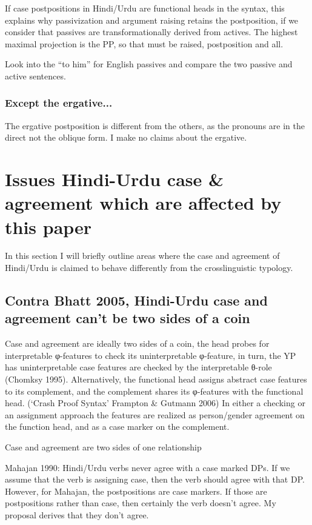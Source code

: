 \documentclass{article}
\begin{document}
If case postpositions in Hindi/Urdu are functional heads in the syntax, this explains why passivization and argument raising retains the postposition, if we consider that passives are transformationally derived from actives. The highest maximal projection is the PP, so that must be raised, postposition and all.

Look into the ``to him” for English passives and compare the two passive and active sentences.

\subsubsection{Except the ergative...}
The ergative postposition is different from the others, as the pronouns are in the direct not the oblique form. I make no claims about the ergative.


\section{Issues Hindi-Urdu case \& agreement which are affected by this paper}

In this section I will briefly outline areas where the case and agreement of Hindi/Urdu is claimed to behave differently from the crosslinguistic typology.

\subsection{Contra Bhatt 2005, Hindi-Urdu case and agreement can't be two sides of a coin}

Case and agreement are ideally two sides of a coin, the head probes for interpretable φ-features to check its uninterpretable φ-feature, in turn, the YP has uninterpretable case features are checked by the interpretable θ-role (Chomksy 1995).  Alternatively, the functional head assigns abstract case features to its complement, and the complement shares its φ-features with the functional head. (`Crash Proof Syntax' Frampton \& Gutmann 2006) In either a checking or an assignment approach the features are realized as person/gender agreement on the function head, and as a case marker on the complement.

\begin{example}Case and agreement are two sides of one relationship
\end{example}

Mahajan 1990: Hindi/Urdu verbs never agree with a case marked DPs. If we assume that the verb is assigning case, then the verb should agree with that DP. However, for Mahajan, the postpositions are case markers. If those are postpositions rather than case, then certainly the verb doesn't agree. My proposal derives that they don't agree.
\end{document}
